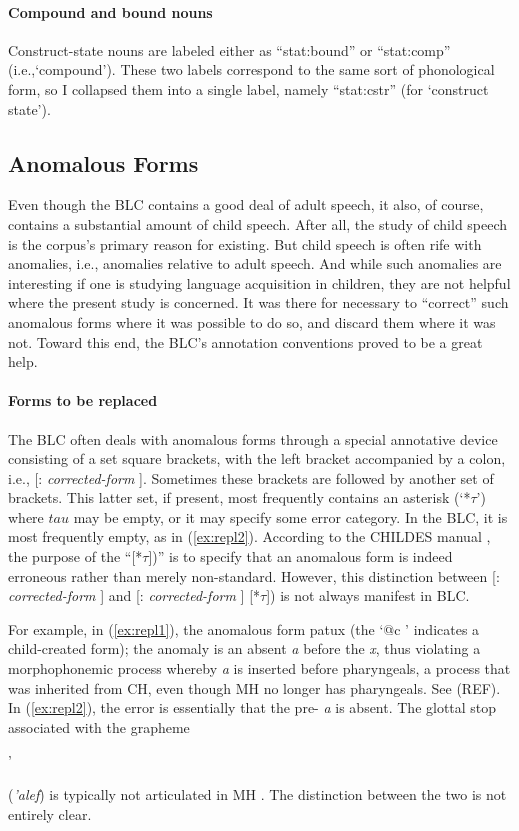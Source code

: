 \paragraph{Compound and bound nouns}
Construct-state nouns are labeled either as ``\textsf{stat:bound}'' 
or ``\textsf{stat:comp}'' (i.e.,`compound'). 
These two labels correspond to the same sort of phonological form, 
 so I collapsed them into a single label, namely 
``\textsf{stat:cstr}'' (for `construct state').

\subsection{Anomalous Forms}\label{sec:anomolous}

Even though the \ac{BLC} contains a good deal of adult speech, it also, 
of course, contains a substantial amount of child speech. After all, the study 
of child speech is the corpus's primary reason for existing. But child 
speech is often rife with anomalies, i.e., anomalies relative to adult speech. 
And while such anomalies are interesting if one is studying language acquisition 
in children, they are not helpful where the present study is concerned. It 
was there for necessary to ``correct'' such anomalous forms where it was 
possible to do so, and discard them where it was not. Toward this end, 
the \ac{BLC}'s annotation conventions proved to be a great help.

\paragraph{Forms to be replaced}
The \ac{BLC} often deals with anomalous forms through a special 
annotative device consisting of a set square brackets, with the left bracket 
accompanied
by a colon, i.e., \textsf{[: \textit{corrected-form} ]}. Sometimes these brackets 
are followed by another set
of brackets. This latter set, if present, most frequently contains an asterisk 
(`*$\tau$') where $tau$ may be empty, or it may specify some error category. 
In the \ac{BLC}, it is most frequently empty, as in (\ref{ex:repl2}). 
According to the CHILDES manual \citep{macwhinney:2000b}, the purpose 
of the ``\textsf{[*$\tau$])}'' 
is to specify that an anomalous form is 
indeed erroneous rather than merely non-standard. 
However, this distinction between 
\textsf{[: \textit{corrected-form} ]} and 
\textsf{[: \textit{corrected-form} ] [*{$\tau$}])} is not always manifest in \ac{BLC}.

For example, in (\ref{ex:repl1}), the anomalous 
form \textsf{patux} 
(the `\textsf{@c} ' indicates a child-created form); 
the anomaly is an absent \textit{a} before the \textit{x}, thus violating 
a morphophonemic process 
whereby \textit{a} is inserted before pharyngeals, a process that was inherited 
from \ac{CH}, even though \ac{MH} no longer has pharyngeals. See (REF).
In (\ref{ex:repl2}), the error is essentially that the pre-\textit{} 
\textit{a} is absent. The glottal stop
associated with the grapheme \begin{cjhebrew}'\end{cjhebrew} (\textit{'alef}) 
is typically not articulated in \ac{MH} \citep{montoya:2014}. The distinction
between the two is not entirely clear.

